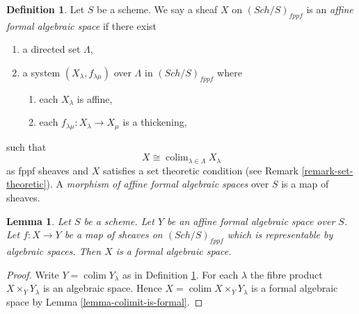 \documentclass{stacks-project}
\theoremstyle{plain}
\newtheorem{lemma}[subsection]{Lemma}
\theoremstyle{definition}
\newtheorem{definition}[subsection]{Definition}
\theoremstyle{remark}
\numberwithin{equation}{subsection}
\def\colim{\mathop{\mathrm{colim}}\nolimits}
\def\Sch{\mathit{Sch}}
\begin{document}
\begin{definition}
\label{definition-affine-formal-algebraic-space}
Let $S$ be a scheme. We say a sheaf $X$ on $(\Sch/S)_{fppf}$ is an
{\it affine formal algebraic space} if there exist
\begin{enumerate}
\item a directed set $\Lambda$,
\item a system $(X_\lambda, f_{\lambda \mu})$ over $\Lambda$
in $(\Sch/S)_{fppf}$ where
\begin{enumerate}
\item each $X_\lambda$ is affine,
\item each $f_{\lambda \mu} : X_\lambda \to X_\mu$ is a thickening,
\end{enumerate}
\end{enumerate}
such that
$$
X \cong \colim_{\lambda \in \Lambda} X_\lambda
$$
as fppf sheaves and $X$ satisfies a set theoretic condition
(see Remark \ref{remark-set-theoretic}). A
{\it morphism of affine formal algebraic spaces}
over $S$ is a map of sheaves.
\end{definition}

\begin{lemma}
\label{lemma-algebraic-space-over-affine-formal}
Let $S$ be a scheme. Let $Y$ be an affine formal algebraic space over $S$.
Let $f : X \to Y$ be a map of sheaves on $(\Sch/S)_{fppf}$ which is
representable by algebraic spaces. Then $X$ is a formal
algebraic space.
\end{lemma}

\begin{proof}
Write $Y = \colim Y_\lambda$ as in
Definition \ref{definition-affine-formal-algebraic-space}.
For each $\lambda$ the fibre product
$X \times_Y Y_\lambda$ is an algebraic space.
Hence $X = \colim X \times_Y Y_\lambda$ is a formal
algebraic space by Lemma \ref{lemma-colimit-is-formal}.
\end{proof}
\end{document}
